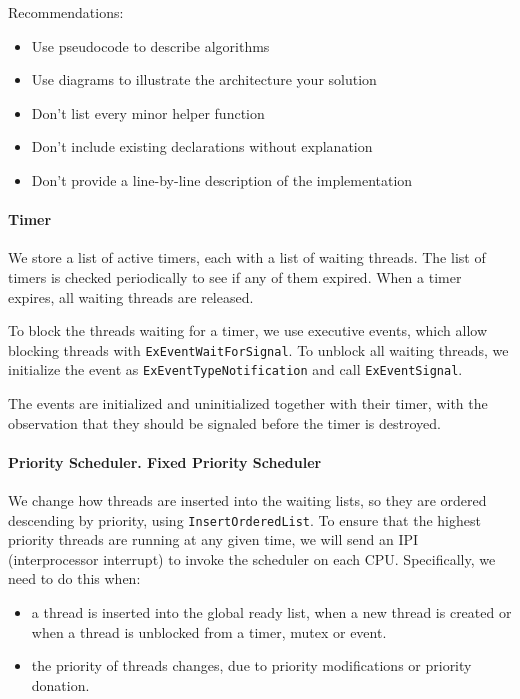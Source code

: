 Recommendations:
\begin{itemize}
    \item Use pseudocode to describe algorithms
    \item Use diagrams to illustrate the architecture your solution
    \item Don't list every minor helper function
    \item Don't include existing declarations without explanation
    \item Don't provide a line-by-line description of the implementation
\end{itemize}

\begin{tcolorbox}[title={Example}]
\paragraph{Timer} We store a list of active timers, each with a list of waiting threads. The list of timers is checked periodically to see if any of them expired. When a timer expires, all waiting threads are released.

To block the threads waiting for a timer, we use executive events, which allow blocking threads with \lstinline{ExEventWaitForSignal}.
To unblock all waiting threads, we initialize the event as \lstinline{ExEventTypeNotification} and call \lstinline{ExEventSignal}.

The events are initialized and uninitialized together with their timer, with the observation that they should be signaled before the timer is destroyed.

\paragraph{Priority Scheduler. Fixed Priority Scheduler} We change how threads are inserted into the waiting lists, so they are ordered descending by priority,
using \lstinline{InsertOrderedList}. To ensure that the highest priority threads are running at any given time,
we will send an IPI (interprocessor interrupt) to invoke the scheduler on each CPU.
Specifically, we need to do this when:
\begin{itemize}
    \item a thread is inserted into the global ready list, when a new thread is created or when a thread is unblocked from a timer, mutex or event.
    \item the priority of threads changes, due to priority modifications or priority donation.
\end{itemize}


\end{tcolorbox}
